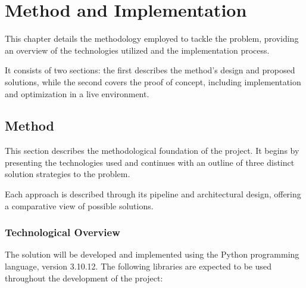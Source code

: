 \chapter{Method and Implementation}
\label{chap:Chapter3}

This chapter details the methodology employed to tackle the problem, providing an overview of the technologies utilized and the implementation process. 

It consists of two sections: the first describes the method's design and proposed solutions, while the second covers the proof of concept, including implementation and optimization in a live environment.

\section{Method}
This section describes the methodological foundation of the project. 
It begins by presenting the technologies used and continues with an outline of three distinct solution strategies to the problem. 

Each approach is described through its pipeline and architectural design, offering a comparative view of possible solutions.

\subsection{Technological Overview}

The solution will be developed and implemented using the Python programming language, version 3.10.12. 
The following libraries are expected to be used throughout the development of the project:

